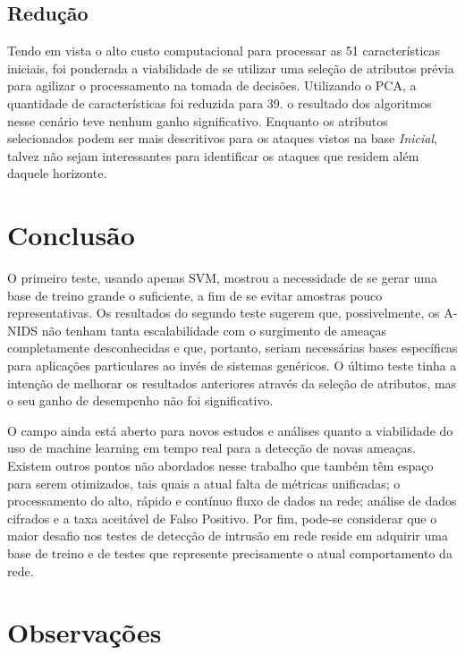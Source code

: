 \documentclass[12pt,a4paper]{article}
\begin{document}
    \subsection{Redução}
    Tendo em vista o alto custo computacional para processar as 51 características iniciais, foi ponderada a viabilidade
    de se utilizar uma seleção de atributos prévia para agilizar o processamento na tomada de decisões. Utilizando o
    PCA, a quantidade de características foi reduzida para 39.
    o resultado dos algoritmos nesse cenário teve nenhum ganho significativo. Enquanto os atributos selecionados podem
    ser mais descritivos para os ataques vistos na base \textit{Inicial}, talvez não sejam interessantes para
    identificar os ataques que residem além daquele horizonte.


\section{Conclusão}
    \par O primeiro teste, usando apenas SVM, mostrou a necessidade de se gerar uma base de treino grande o suficiente, a
    fim de se evitar amostras pouco representativas. Os resultados do segundo teste sugerem que, possivelmente, os A-NIDS
    não tenham tanta escalabilidade com o surgimento de ameaças completamente desconhecidas e que, portanto, seriam
    necessárias bases específicas para aplicações particulares ao invés de sistemas genéricos. O último teste tinha a
    intenção de melhorar os resultados anteriores através da seleção de atributos, mas o seu ganho de desempenho não foi
    significativo.
    \par O campo ainda está aberto para novos estudos e análises quanto a viabilidade do uso de machine learning em tempo
    real para a detecção de novas ameaças. Existem outros pontos não abordados nesse trabalho que também têm espaço para
    serem otimizados, tais quais a atual falta de métricas unificadas; o processamento do alto, rápido e contínuo fluxo de
    dados na rede; análise de dados cifrados e a taxa aceitável de Falso Positivo. Por fim, pode-se considerar que
     o maior desafio nos testes de detecção de intrusão em rede reside em adquirir uma base de treino e de testes que
 represente precisamente o atual comportamento da rede.


\newpage

\section{Observações}
\end{document}
